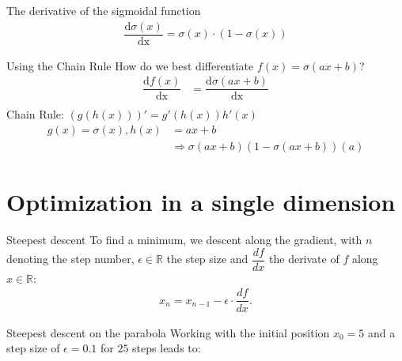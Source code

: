 \documentclass{beamer}
\begin{document}
    \begin{frame}{The derivative of the sigmoidal function}
    \begin{align}
      \dfrac{\text{d}\sigma(x)}{\text{dx}} = \sigma(x) \cdot (1 - \sigma(x))
    \end{align}
    \begin{figure}
      \centering
      
    \end{figure}
    \end{frame}

    \begin{frame}{Using the Chain Rule}
      How do we best differentiate $f(x) = \sigma( ax + b)$?
      \begin{align}
        \dfrac{\text{d}f(x)}{\text{dx}} &= \dfrac{\text{d}\sigma( ax + b)}{\text{dx}}  \\
      \end{align}
      Chain Rule:    $(g(h(x)))' = g'(h(x))h'(x) $
      \begin{align}
        g(x) = \sigma(x), h(x) &= ax+b \\
                               &\Rightarrow \sigma(ax+b)(1 - \sigma(ax+b))(a) 
      \end{align}
    \end{frame}

    \section{Optimization in a single dimension}
    \begin{frame}{Steepest descent}
      To find a minimum, we descent along the gradient, with $n$ denoting the step number,
      $\epsilon \in \mathbb{R}$ the step size and $\dfrac{d f}{dx}$ the derivate of $f$ along 
      $x \in \mathbb{R}$:
      \begin{align}
        x_n = x_{n-1} - \epsilon \cdot \dfrac{d f}{dx}.
      \end{align}
    \end{frame}


    \begin{frame}{Steepest descent on the parabola}
      Working with the initial position $x_0 = 5$ and a step size of $\epsilon = 0.1$ for $25$ steps leads to: 
      \begin{figure}
        
        
      \end{figure}
    \end{frame}
\end{document}

